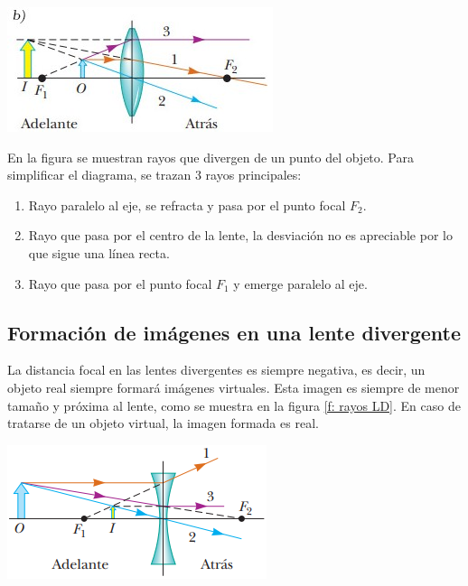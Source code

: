 \documentclass[a4paper,12pt]{article}
\newenvironment{Figure}
  {\par\medskip\noindent\minipage{\linewidth}}
  {\endminipage\par\medskip}
\begin{document}
\begin{multicols*}{2}
        \begin{Figure}
            \centering
            \includegraphics[width=0.7\linewidth]{DiagramaRayosLC2.jpg}
            \label{Diag rayos LC}
        \end{Figure}

       En la figura se muestran rayos que divergen de un punto del objeto. Para simplificar el diagrama, se trazan 3 rayos principales:

        \begin{enumerate}
            \item Rayo paralelo al eje, se refracta y pasa por el punto focal $F_{2}$.
            \item Rayo que pasa por el centro de la lente, la desviación no es apreciable por lo que sigue una línea recta.
            \item Rayo que pasa por el punto focal $F_{1}$ y emerge paralelo al eje.
        \end{enumerate}

    \subsection*{Formación de imágenes en una lente divergente}

        La distancia focal en las lentes divergentes es siempre negativa, es decir, un objeto real siempre formará imágenes virtuales. Esta imagen es siempre de menor tamaño y próxima al lente, como se muestra en la figura \ref{f: rayos LD}. En caso de tratarse de un objeto virtual, la imagen formada es real.

        \begin{Figure}
            \centering
            \includegraphics[width=0.9\linewidth]{DiagRayosLD.png}
            \label{f: rayos LD}
        \end{Figure}


\end{multicols*}
\end{document}
